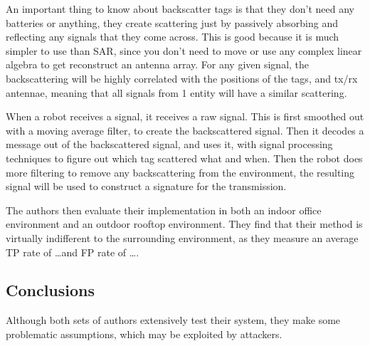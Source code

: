 An important thing to know about backscatter tags is that they don't need any batteries or anything, they create scattering just by passively absorbing and reflecting any signals that they come across. This is good because it is much simpler to use than SAR, since you don't need to move or use any complex linear algebra to get reconstruct an antenna array. For any given signal, the backscattering will be highly correlated with the positions of the tags, and tx/rx antennae, meaning that all signals from 1 entity will have a similar scattering.

When a robot receives a signal, it receives a raw signal. This is first smoothed out with a moving average filter, to create the backscattered signal. Then it decodes a message out of the backscattered signal, and uses it, with signal processing techniques to figure out which tag scattered what and when. Then the robot does more filtering to remove any backscattering from the environment, the resulting signal will be used to construct a signature for the transmission.

The authors then evaluate their implementation in both an indoor office environment and an outdoor rooftop environment. They find that their method is virtually indifferent to the surrounding environment, as they measure an average TP rate of \dots and FP rate of \dots.

\subsection{Conclusions}

Although both sets of authors extensively test their system, they make some problematic assumptions, which may be exploited by attackers. 

